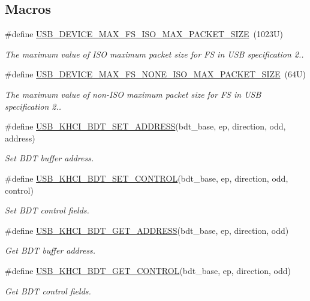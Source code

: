 \subsection*{Macros}
\begin{DoxyCompactItemize}
\item 
\#define \hyperlink{group__usb__device__controller__khci__driver_ga9f6b9327136f7d46cd44196625ffbe57}{U\-S\-B\-\_\-\-D\-E\-V\-I\-C\-E\-\_\-\-M\-A\-X\-\_\-\-F\-S\-\_\-\-I\-S\-O\-\_\-\-M\-A\-X\-\_\-\-P\-A\-C\-K\-E\-T\-\_\-\-S\-I\-Z\-E}~(1023\-U)
\begin{DoxyCompactList}\small\item\em The maximum value of I\-S\-O maximum packet size for F\-S in U\-S\-B specification 2.. \end{DoxyCompactList}\item 
\#define \hyperlink{group__usb__device__controller__khci__driver_gad2104656ccd927add52df23fc6618043}{U\-S\-B\-\_\-\-D\-E\-V\-I\-C\-E\-\_\-\-M\-A\-X\-\_\-\-F\-S\-\_\-\-N\-O\-N\-E\-\_\-\-I\-S\-O\-\_\-\-M\-A\-X\-\_\-\-P\-A\-C\-K\-E\-T\-\_\-\-S\-I\-Z\-E}~(64\-U)
\begin{DoxyCompactList}\small\item\em The maximum value of non-\/\-I\-S\-O maximum packet size for F\-S in U\-S\-B specification 2.. \end{DoxyCompactList}\item 
\#define \hyperlink{group__usb__device__controller__khci__driver_ga1ba0ab661daf2302b64972f524948489}{U\-S\-B\-\_\-\-K\-H\-C\-I\-\_\-\-B\-D\-T\-\_\-\-S\-E\-T\-\_\-\-A\-D\-D\-R\-E\-S\-S}(bdt\-\_\-base, ep, direction, odd, address)
\begin{DoxyCompactList}\small\item\em Set B\-D\-T buffer address. \end{DoxyCompactList}\item 
\#define \hyperlink{group__usb__device__controller__khci__driver_gad93495da57693ca917381eaa4bf0e1d5}{U\-S\-B\-\_\-\-K\-H\-C\-I\-\_\-\-B\-D\-T\-\_\-\-S\-E\-T\-\_\-\-C\-O\-N\-T\-R\-O\-L}(bdt\-\_\-base, ep, direction, odd, control)
\begin{DoxyCompactList}\small\item\em Set B\-D\-T control fields. \end{DoxyCompactList}\item 
\#define \hyperlink{group__usb__device__controller__khci__driver_ga8f053b5c8affe26aa04d161449230985}{U\-S\-B\-\_\-\-K\-H\-C\-I\-\_\-\-B\-D\-T\-\_\-\-G\-E\-T\-\_\-\-A\-D\-D\-R\-E\-S\-S}(bdt\-\_\-base, ep, direction, odd)
\begin{DoxyCompactList}\small\item\em Get B\-D\-T buffer address. \end{DoxyCompactList}\item 
\#define \hyperlink{group__usb__device__controller__khci__driver_ga76ad3cb952ddc0c7fc7e3c5012a62f89}{U\-S\-B\-\_\-\-K\-H\-C\-I\-\_\-\-B\-D\-T\-\_\-\-G\-E\-T\-\_\-\-C\-O\-N\-T\-R\-O\-L}(bdt\-\_\-base, ep, direction, odd)
\begin{DoxyCompactList}\small\item\em Get B\-D\-T control fields. \end{DoxyCompactList}\end{DoxyCompactItemize}
